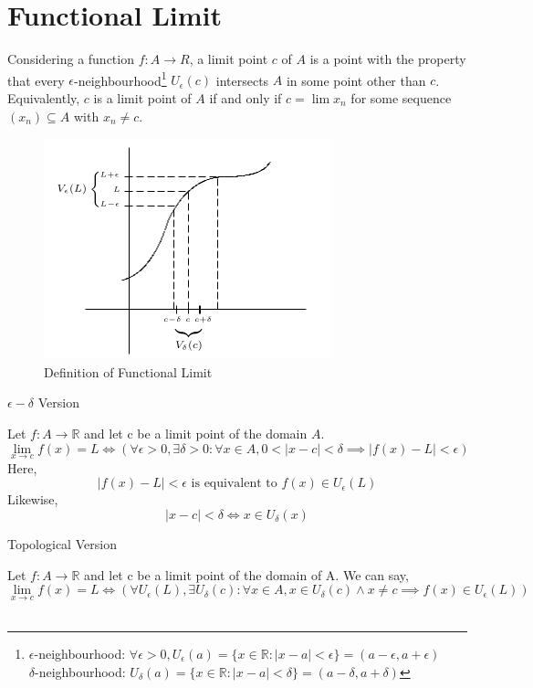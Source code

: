 \documentclass[12pt]{article}
\begin{document}
\section{Functional Limit}
Considering a function $f:A \to R$, a limit point $c$ of $A$ is a point with the property that every $\epsilon$-neighbourhood\footnote{     $\epsilon$-neighbourhood: 
    $ \forall \epsilon > 0, U_\epsilon (a) = \{ x\in\mathbb{R} : |x-a| < \epsilon \} = (a-\epsilon, a+\epsilon)  $ \\
    \quad$\delta$-neighbourhood: $ U_\delta(a) = \{x \in \mathbb{R} : |x-a| < \delta \} = (a-\delta, a+\delta) $
} $U_\epsilon(c)$ intersects $A$ in some point other than $c$. Equivalently, $c$ is a limit point of $A$  if and only if $c=\lim x_n$ for some sequence $(x_n) \subseteq A$ with $x_n \neq c$. \\
\begin{figure}[htpb]
    \centering
    \includegraphics[scale=0.5]{Functional Limit Definition.png}
    \caption{\small Definition of Functional Limit}
\end{figure}

\underline{\textbf{}}

\begin{definition}{$\epsilon-\delta$ Version}

Let $f: A \to \mathbb{R}$ and let c be a limit point of the domain $A$. \[
    \lim_{x \to c} f(x) = L \iff (\forall \epsilon>0, \exists\delta>0 : \forall x \in A, 0 < |x-c| < \delta \implies |f(x)-L| < \epsilon)
\]
Here, \[
    |f(x)-L|<\epsilon \text{ is equivalent to } f(x) \in U_\epsilon(L)
\]
Likewise, \[
    |x-c|<\delta \iff x \in U_\delta(x)
\]
\end{definition}

\begin{definition}{Topological Version}

    Let $f : A \to \mathbb{R}$ and let c be a limit point of the domain of A. We can say, \[
        \lim_{x \to c} f(x)=L \iff ( \forall U_\epsilon(L), \exists U_\delta(c) : \forall x \in A, x \in U_\delta(c) \land x \neq c \implies f(x) \in U_\epsilon(L) )
    \] \\
\end{definition}
\end{document}

